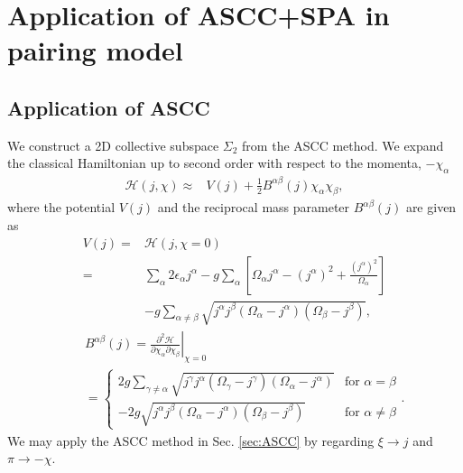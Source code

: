 \documentclass[11pt]{book} %
\begin{document}
\section{Application of ASCC+SPA in pairing model}

\subsection{Application of ASCC}

We construct a 2D collective subspace $\Sigma_2$ from the ASCC method.
We expand the classical Hamiltonian up to second order with respect to
the momenta, $-\chi_{\alpha}$
\begin{align}
  \mathcal{H}(j,\chi) \approx& V(j) + \frac{1}{2}B^{\alpha\beta}(j)\chi_{\alpha}\chi_{\beta},
\end{align}
where the potential $V(j)$ and the reciprocal mass parameter
$B^{\alpha\beta}(j)$ are given as
\begin{align}
  V(j) =& \mathcal{H}(j,\chi=0) \nonumber \\
	=& \sum_{\alpha} 2\epsilon_{\alpha}j^{\alpha} - g\sum_{\alpha} \left[ \Omega_{\alpha}j^{\alpha} - (j^{\alpha})^2 +\frac{(j^{\alpha})^2}{\Omega_{\alpha}} \right] \nonumber \\
  &- g\sum_{\alpha\ne \beta} \sqrt{j^{\alpha}j^{\beta}(\Omega_{\alpha}-j^{\alpha})(\Omega_{\beta}-j^{\beta})}, 	
\end{align}
\begin{eqnarray}
&&B^{\alpha\beta}(j) = \left. \frac{\partial^2\mathcal{H}}{\partial\chi_{\alpha}\partial\chi_{\beta}} \right|_{\chi=0} \\
\label{mass}
&&=
	\begin{cases}
2g\sum_{\gamma\ne \alpha} \sqrt{j^{\gamma}j^{\alpha}(\Omega_{\gamma}-j^{\gamma})(\Omega_{\alpha}-j^{\alpha})}
		& \text{for $\alpha=\beta$} \\
-2g\sqrt{j^{\alpha}j^{\beta}(\Omega_{\alpha}-j^{\alpha})(\Omega_{\beta}-j^{\beta})}
		& \text{for $\alpha\ne\beta$}
	\end{cases}. \nonumber
\end{eqnarray}
We may apply the ASCC method in Sec. \ref{sec:ASCC}
by regarding $\xi\to j$ and $\pi\to-\chi$.
\end{document}
